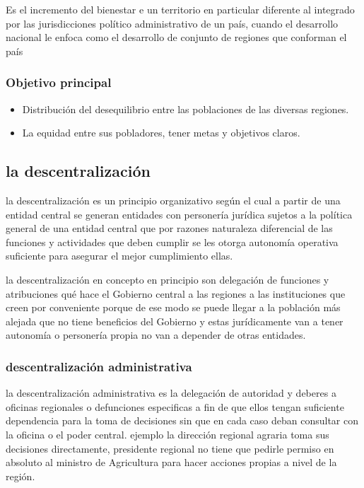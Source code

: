 \documentclass[
  a4paper,
]{article}
\providecommand{\tightlist}{%
  \setlength{\itemsep}{0pt}\setlength{\parskip}{0pt}}\usepackage{longtable,booktabs,array}
\begin{document}
Es el incremento del bienestar e un territorio en particular diferente
al integrado por las jurisdicciones político administrativo de un país,
cuando el desarrollo nacional le enfoca como el desarrollo de conjunto
de regiones que conforman el país

\hypertarget{objetivo-principal}{%
\subsubsection{Objetivo principal}\label{objetivo-principal}}

\begin{itemize}
\tightlist
\item
  Distribución del desequilibrio entre las poblaciones de las diversas
  regiones.
\item
  La equidad entre sus pobladores, tener metas y objetivos claros.
\end{itemize}

\hypertarget{la-descentralizaciuxf3n}{%
\subsection{la descentralización}\label{la-descentralizaciuxf3n}}

la descentralización es un principio organizativo según el cual a partir
de una entidad central se generan entidades con personería jurídica
sujetos a la política general de una entidad central que por razones
naturaleza diferencial de las funciones y actividades que deben cumplir
se les otorga autonomía operativa suficiente para asegurar el mejor
cumplimiento ellas.

la descentralización en concepto en principio son delegación de
funciones y atribuciones qué hace el Gobierno central a las regiones a
las instituciones que creen por conveniente porque de ese modo se puede
llegar a la población más alejada que no tiene beneficios del Gobierno y
estas jurídicamente van a tener autonomía o personería propia no van a
depender de otras entidades.

\hypertarget{descentralizaciuxf3n-administrativa}{%
\subsubsection{descentralización
administrativa}\label{descentralizaciuxf3n-administrativa}}

la descentralización administrativa es la delegación de autoridad y
deberes a oficinas regionales o defunciones especificas a fin de que
ellos tengan suficiente dependencia para la toma de decisiones sin que
en cada caso deban consultar con la oficina o el poder central. ejemplo
la dirección regional agraria toma sus decisiones directamente,
presidente regional no tiene que pedirle permiso en absoluto al ministro
de Agricultura para hacer acciones propias a nivel de la región.
\end{document}
